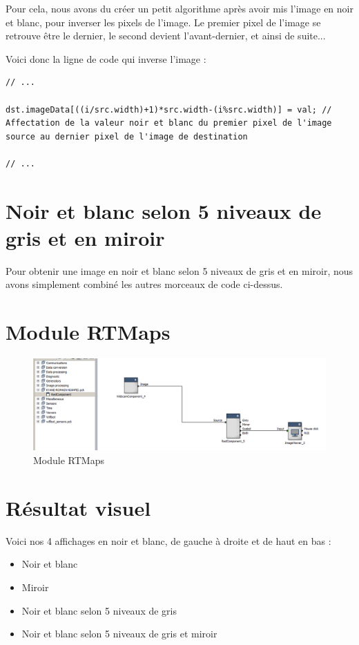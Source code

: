 Pour cela, nous avons du créer un petit algorithme après avoir mis l'image en noir et blanc, pour inverser les pixels de l'image. Le premier pixel de l'image se retrouve être le dernier, le second devient l'avant-dernier, et ainsi de suite...

\medskip

\noindent Voici donc la ligne de code qui inverse l'image :
\begin{lstlisting}
// ...

dst.imageData[((i/src.width)+1)*src.width-(i%src.width)] = val; // Affectation de la valeur noir et blanc du premier pixel de l'image source au dernier pixel de l'image de destination

// ...
\end{lstlisting}

\section{Noir et blanc selon 5 niveaux de gris et en miroir}
Pour obtenir une image en noir et blanc selon 5 niveaux de gris et en miroir, nous avons simplement combiné les autres morceaux de code ci-dessus.


\section{Module RTMaps}
\begin{figure}[!h]
   \centering\includegraphics[width=1.0\textwidth]{pictures/screen.png}
   \caption{Module RTMaps}
\end{figure}

\section{Résultat visuel}

Voici nos 4 affichages en noir et blanc, de gauche à droite et de haut en bas :
\begin{itemize}
  \item Noir et blanc
  \item Miroir
  \item Noir et blanc selon 5 niveaux de gris
  \item Noir et blanc selon 5 niveaux de gris et miroir
\end{itemize}


